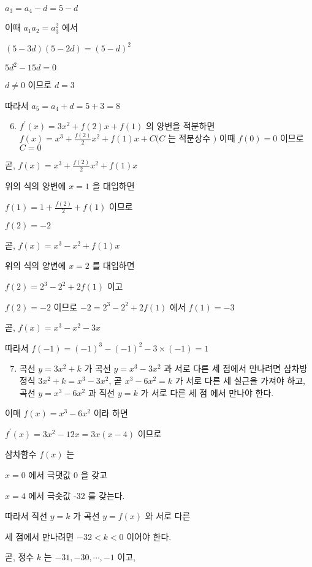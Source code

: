 \documentclass[10pt]{article}
\begin{document}
$a_{3}=a_{4}-d=5-d$

이때 $a_{1} a_{2}=a_{3}^{2}$ 에서

$(5-3 d)(5-2 d)=(5-d)^{2}$

$5 d^{2}-15 d=0$

$d \neq 0$ 이므로 $d=3$

따라서 $a_{5}=a_{4}+d=5+3=8$

\begin{enumerate}
  \setcounter{enumi}{5}
  \item $f^{\prime}(x)=3 x^{2}+f(2) x+f(1)$ 의 양변을 적분하면 $f(x)=x^{3}+\frac{f(2)}{2} x^{2}+f(1) x+C(C$ 는 적분상수 $)$ 이때 $f(0)=0$ 이므로 $C=0$
\end{enumerate}

곧, $f(x)=x^{3}+\frac{f(2)}{2} x^{2}+f(1) x$

위의 식의 양변에 $x=1$ 을 대입하면

$f(1)=1+\frac{f(2)}{2}+f(1)$ 이므로

$f(2)=-2$

곧, $f(x)=x^{3}-x^{2}+f(1) x$

위의 식의 양변에 $x=2$ 를 대입하면

$f(2)=2^{3}-2^{2}+2 f(1)$ 이고

$f(2)=-2$ 이므로 $-2=2^{3}-2^{2}+2 f(1)$ 에서 $f(1)=-3$

곧, $f(x)=x^{3}-x^{2}-3 x$

따라서 $f(-1)=(-1)^{3}-(-1)^{2}-3 \times(-1)=1$

\begin{enumerate}
  \setcounter{enumi}{6}
  \item 곡선 $y=3 x^{2}+k$ 가 곡선 $y=x^{3}-3 x^{2}$ 과 서로 다른 세 점에서 만나려면 삼차방정식 $3 x^{2}+k=x^{3}-3 x^{2}$, 곧 $x^{3}-6 x^{2}=k$ 가 서로 다른 세 실근을 가져야 하고, 곡선 $y=x^{3}-6 x^{2}$ 과 직선 $y=k$ 가 서로 다른 세 점 에서 만나야 한다.
\end{enumerate}

이매 $f(x)=x^{3}-6 x^{2}$ 이라 하면

$f^{\prime}(x)=3 x^{2}-12 x=3 x(x-4)$ 이므로

삼차함수 $f(x)$ 는

$x=0$ 에서 극댓값 0 을 갖고

$x=4$ 에서 극솟값 -32 를 갖는다.

따라서 직선 $y=k$ 가 곡선 $y=f(x)$ 와 서로 다른

세 점에서 만나려면 $-32<k<0$ 이어야 한다.

곧, 정수 $k$ 는 $-31,-30, \cdots,-1$ 이고,
\end{document}
